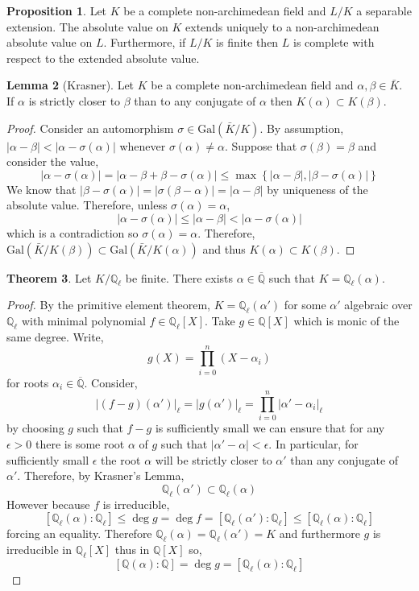 \documentclass{article}
\newcommand{\Gal}[1]{\mathrm{Gal}\left( #1 \right)}
\newcommand{\Q}{\mathbb{Q}}
\theoremstyle{definition}
\newtheorem{theorem}{Theorem}[section]
\newtheorem{lemma}[theorem]{Lemma}
\newtheorem{proposition}[theorem]{Proposition}
\begin{document}
\begin{proposition}
Let $K$ be a complete non-archimedean field and $L / K$ a separable extension. The absolute value on $K$ extends uniquely to a non-archimedean absolute value on $L$. Furthermore, if $L / K$ is finite then $L$ is complete with respect to the extended absolute value. 
\end{proposition}

\begin{lemma}[Krasner]
Let $K$ be a complete non-archimedean field and $\alpha, \beta \in \bar{K}$. If $\alpha$ is strictly closer to $\beta$ than to any conjugate of $\alpha$ then $K(\alpha) \subset K(\beta)$.
\end{lemma}

\begin{proof}
Consider an automorphism $\sigma \in \Gal{\bar{K} / K}$. By assumption, $|\alpha - \beta | < |\alpha - \sigma(\alpha)|$ whenever $\sigma(\alpha) \neq \alpha$. Suppose that $\sigma(\beta) = \beta$ and consider the value,
\[ |\alpha - \sigma(\alpha)| = |\alpha - \beta + \beta - \sigma(\alpha) | \le \max \left\{ | \alpha - \beta |, | \beta - \sigma(\alpha)| \right\} \]
We know that $|\beta - \sigma(\alpha)| = |\sigma(\beta - \alpha)| = |\alpha - \beta|$ by uniqueness of the absolute value. Therefore, unless $\sigma(\alpha) = \alpha$,
\[ |\alpha - \sigma(\alpha)| \le |\alpha - \beta| < |\alpha - \sigma(\alpha)| \] 
which is a contradiction so $\sigma(\alpha) = \alpha$. Therefore, $\Gal{\bar{K} / K(\beta)} \subset \Gal{\bar{K} / K(\alpha)}$ and thus $K(\alpha) \subset K(\beta)$. 
\end{proof}

\begin{theorem} \label{thm:algebraic_extensions_adics}
Let $K / \Q_{\ell}$ be finite. There exists $\alpha \in \overline{\Q}$ such that $K = \Q_{\ell}(\alpha)$. 
\end{theorem}

\begin{proof}
By the primitive element theorem, $K = \Q_{\ell}(\alpha')$ for some $\alpha'$ algebraic over $\Q_{\ell}$ with minimal polynomial $f \in \Q_{\ell}[X]$. Take $g \in \Q[X]$ which is monic of the same degree. Write,
\[ g(X) = \prod_{i = 0}^n (X - \alpha_i) \]
for roots $\alpha_i \in \overline{\Q}$.
Consider,
\[ |(f - g)(\alpha')|_{\ell} = |g(\alpha')|_{\ell} = \prod_{i = 0}^n |\alpha' - \alpha_i|_{\ell} \] 
by choosing $g$ such that $f - g$ is sufficiently small we can ensure that for any $\epsilon > 0$ there is some root $\alpha$ of $g$ such that $|\alpha' - \alpha| < \epsilon$. In particular, for sufficiently small $\epsilon$ the root $\alpha$ will be strictly closer to $\alpha'$ than any conjugate of $\alpha'$. Therefore, by Krasner's Lemma,
\[ \Q_{\ell}(\alpha') \subset \Q_{\ell}(\alpha) \]
However because $f$ is irreducible,
\[ [\Q_{\ell}(\alpha) : \Q_{\ell}] \le \deg{g} = \deg{f} = [\Q_{\ell}(\alpha') : \Q_{\ell}] \le [\Q_{\ell}(\alpha) : \Q_{\ell}]  \]
forcing an equality. Therefore $\Q_{\ell}(\alpha) = \Q_{\ell}(\alpha') = K$ and furthermore $g$ is irreducible in $\Q_{\ell}[X]$ thus in $\Q[X]$ so,
 \[ [\Q(\alpha) : \Q] = \deg{g} = [\Q_{\ell}(\alpha) : \Q_{\ell} ] \]
\end{proof}
\end{document}
